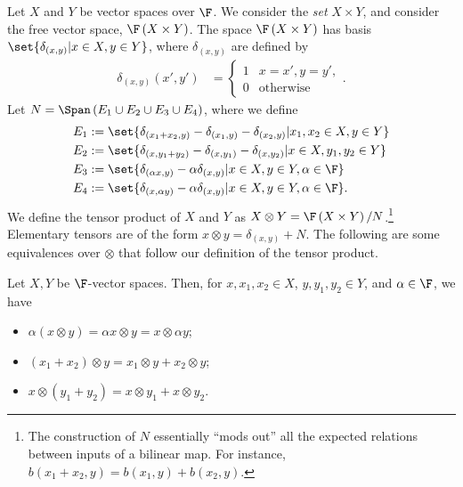\documentclass[10pt]{mypackage}
\begin{document}
Let $X$ and $Y$ be vector spaces over $\F$. We consider the \textit{set} $X\times Y$, and consider the free vector space, $\F\left(X\times Y\right)$. The space $\F\left(X\times Y\right)$ has basis $\set{\delta_{\left(x,y\right)}| x\in X,y\in Y}$, where $\delta_{(x,y)}$ are defined by
\begin{align*}
  \delta_{(x,y)}\left(x',y'\right) &= \begin{cases}
    1 & x=x',y=y',\\
    0 & \text{otherwise}
  \end{cases}.
\end{align*}
Let $N = \Span\left(E_1\cup E_2\cup E_3\cup E_4\right)$, where we define
\begin{align*}
  E_{1} &:= \set{\delta_{\left(x_1 + x_2,y\right)} - \delta_{\left(x_1,y\right)} - \delta_{\left(x_2,y\right)}| x_1,x_2\in X,y\in Y}\\
  E_{2} &:= \set{\delta_{\left(x,y_1 + y_2\right)} - \delta_{\left(x,y_1\right)} - \delta_{\left(x,y_2\right)}| x\in X,y_1,y_2\in Y}\\
  E_{3} &:= \set{\delta_{\left(\alpha x,y\right)} - \alpha \delta_{\left(x,y\right)}| x\in X,y\in Y,\alpha\in \F}\\
  E_{4} &:= \set{\delta_{\left(x,\alpha y\right)} - \alpha \delta_{\left(x,y\right)}| x\in X,y\in Y,\alpha\in \F}.
\end{align*}
We define the tensor product of $X$ and $Y$ as $X\otimes Y = \F\left(X\times Y\right)/N$.\footnote{The construction of $N$ essentially ``mods out'' all the expected relations between inputs of a bilinear map. For instance, $b\left(x_1 + x_2,y\right) = b\left(x_1,y\right) + b\left(x_2,y\right)$.} Elementary tensors are of the form $x\otimes y = \delta_{\left(x,y\right)} + N$. The following are some equivalences over $\otimes$ that follow our definition of the tensor product.
\begin{lemma}
  Let $X,Y$ be $\F$-vector spaces. Then, for $x,x_1,x_2\in X$, $y,y_1,y_2\in Y$, and $\alpha\in \F$, we have
  \begin{itemize}
    \item $\displaystyle \alpha\left(x\otimes y\right) = \alpha x\otimes y = x\otimes \alpha y$;
    \item $\displaystyle \left(x_1 + x_2\right)\otimes y = x_1\otimes y + x_2\otimes y$;
    \item $x\otimes \left(y_1 + y_2\right) = x\otimes y_1 + x\otimes y_2$.
  \end{itemize}
\end{lemma}
\end{document}
